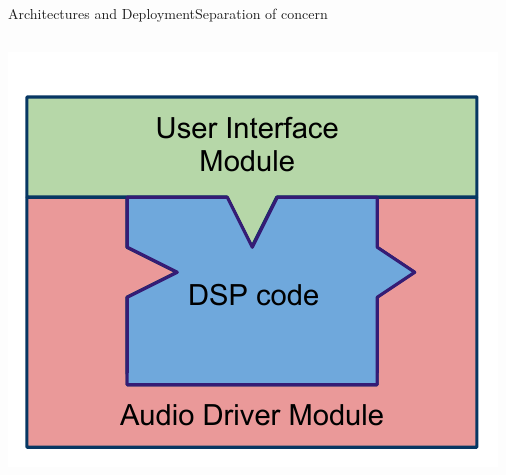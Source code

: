 \begin{frame}{Architectures and Deployment}{Separation of concern}
\begin{columns}[t]
\begin{column}{0.75\textwidth}
	\begin{center}
	\includegraphics[height=0.2\textheight]{images/FaustArchitectureComplete}
	\end{center}
\end{column}
\end{columns}

\end{frame}

